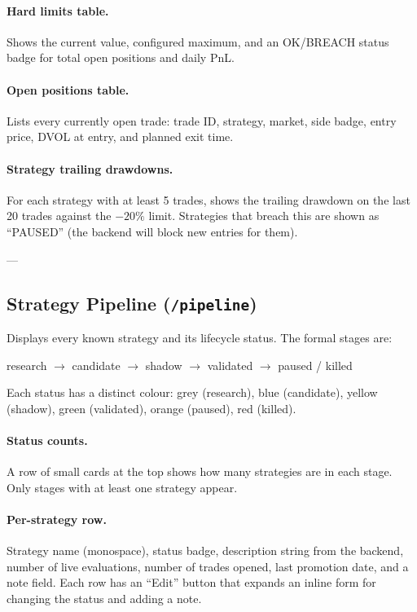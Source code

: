 \documentclass[12pt, a4paper]{article}
\begin{document}
\paragraph{Hard limits table.}
Shows the current value, configured maximum, and an OK/BREACH status badge
for total open positions and daily PnL.

\paragraph{Open positions table.}
Lists every currently open trade: trade ID, strategy, market, side badge,
entry price, DVOL at entry, and planned exit time.

\paragraph{Strategy trailing drawdowns.}
For each strategy with at least 5 trades, shows the trailing drawdown on
the last 20 trades against the $-20\%$ limit. Strategies that breach this
are shown as ``PAUSED'' (the backend will block new entries for them).

---

\subsection{Strategy Pipeline (\texttt{/pipeline})}

Displays every known strategy and its lifecycle status. The formal stages are:

\begin{center}
research $\to$ candidate $\to$ shadow $\to$ validated $\to$ paused / killed
\end{center}

Each status has a distinct colour: grey (research), blue (candidate), yellow
(shadow), green (validated), orange (paused), red (killed).

\paragraph{Status counts.}
A row of small cards at the top shows how many strategies are in each stage.
Only stages with at least one strategy appear.

\paragraph{Per-strategy row.}
Strategy name (monospace), status badge, description string from the backend,
number of live evaluations, number of trades opened, last promotion date, and
a note field. Each row has an ``Edit'' button that expands an inline form for
changing the status and adding a note.
\end{document}
